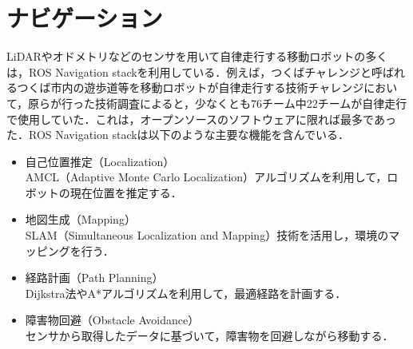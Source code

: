 
\section{ナビゲーション}
LiDARやオドメトリなどのセンサを用いて自律走行する移動ロボットの多くは，ROS Navigation stack\cite{nav1,nav2}を利用している．例えば，つくばチャレンジと呼ばれるつくば市内の遊歩道等を移動ロボットが自律走行する技術チャレンジにおいて，原らが行った技術調査\cite{robomech2024-hara}によると，少なくとも76チーム中22チームが自律走行で使用していた．これは，オープンソースのソフトウェアに限れば最多であった．ROS Navigation stackは以下のような主要な機能を含んでいる．

\begin{itemize}
     \item 自己位置推定（Localization）\\
     AMCL（Adaptive Monte Carlo Localization）アルゴリズムを利用して，ロボットの現在位置を推定する．
     \item 地図生成（Mapping）\\
     SLAM（Simultaneous Localization and Mapping）技術を活用し，環境のマッピングを行う．
     \item 経路計画（Path Planning）\\
     Dijkstra法\cite{dijkstra2022note}やA*アルゴリズム\cite{hart1968formal-astar}を利用して，最適経路を計画する．
     \item 障害物回避（Obstacle Avoidance）\\
     センサから取得したデータに基づいて，障害物を回避しながら移動する．
\end{itemize}

\newpage
